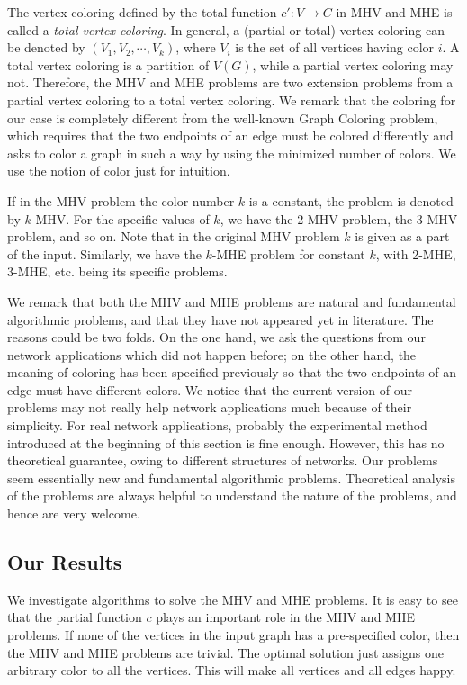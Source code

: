 \documentclass[11pt]{article}
\begin{document}
The vertex coloring defined by the total function $c' \colon V \rightarrow C$
in MHV and MHE is called a {\em total vertex coloring}.
In general, a (partial or total) vertex coloring can be denoted by
$(V_1, V_2, \cdots, V_k)$, where $V_i$ is the set of all vertices having
color $i$. A total vertex coloring is a partition of $V(G)$, while a partial
vertex coloring may not. Therefore, the MHV and MHE problems are two extension
problems from a partial vertex coloring to a total vertex coloring.
We remark that the coloring for our case is completely different from the
well-known Graph Coloring problem, which requires that the two endpoints of
an edge must be colored differently and asks to color a graph in such a way
by using the minimized number of colors. We use the notion of color just
for intuition.

If in the MHV problem the color number $k$ is a constant, the problem is
denoted by $k$-MHV. For the specific values of $k$, we have the 2-MHV problem,
the 3-MHV problem, and so on. Note that in the original MHV problem $k$ is
given as a part of the input. Similarly, we have the $k$-MHE problem for
constant $k$, with 2-MHE, 3-MHE, etc. being its specific problems.

We remark that both the MHV and MHE problems are natural and fundamental
algorithmic problems, and that they have not appeared yet in literature.
The reasons could be two folds. On the one hand, we ask the questions from
our network applications which did not happen before; on the other hand,
the meaning of coloring has been specified previously so that the two
endpoints of an edge must have different colors.
We notice that the current version of our problems may not really help
network applications much because of their simplicity.
For real network applications, probably the experimental method \cite{LLPP12}
introduced at the beginning of this section is fine enough.
However, this has no theoretical guarantee, owing to different structures
of networks. Our problems seem essentially new and fundamental algorithmic
problems. Theoretical analysis of the problems are always helpful to
understand the nature of the problems, and hence are very welcome.




\subsection{Our Results}
We investigate algorithms to solve the MHV and MHE problems.
It is easy to see that the partial function $c$ plays an important role
in the MHV and MHE problems. If none of the vertices in the input graph has
a pre-specified color, then the MHV and MHE problems are trivial. The optimal
solution just assigns one arbitrary color to all the vertices. This will
make all vertices and all edges happy.
\end{document}

